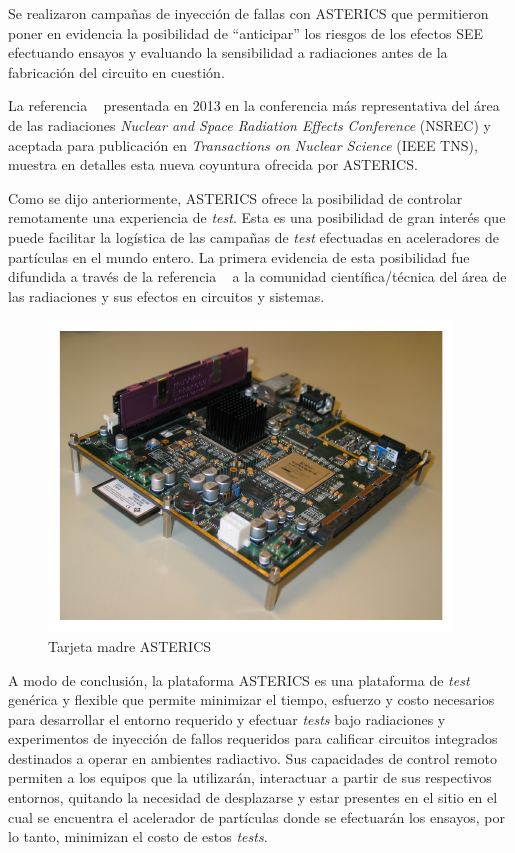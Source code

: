 \documentclass[a4paper,openright,12pt]{report}
\begin{document}
Se realizaron campañas de inyección de fallas con ASTERICS que permitieron poner en evidencia la posibilidad de ``anticipar'' los riesgos de los efectos SEE efectuando ensayos y evaluando la sensibilidad a radiaciones antes de la fabricación del circuito en cuestión. 

La referencia ~\cite{6678236} presentada en 2013 en la conferencia  más representativa del área de las radiaciones \textit{Nuclear and Space Radiation Effects Conference} (NSREC) y aceptada para publicación en \textit{Transactions on Nuclear Science}  (IEEE TNS), muestra en detalles esta nueva coyuntura ofrecida por ASTERICS. 

Como se dijo anteriormente, ASTERICS ofrece la posibilidad de controlar  remotamente una experiencia de \textit{test}. Esta es una posibilidad de gran interés que puede facilitar la logística de las campañas de \textit{test} efectuadas en aceleradores de partículas en el mundo entero. La primera evidencia de esta posibilidad fue difundida a través de la referencia ~\cite{4638624} a la comunidad científica/técnica del área de las radiaciones y sus efectos en circuitos y sistemas.
 

\begin{figure}[H]
	\centering
	\includegraphics[width=0.45 \textwidth]{img/ASTERICS2.pdf}
	\caption{Tarjeta madre ASTERICS}
	\label{ASTERICS1}
\end{figure}


A modo de conclusión, la plataforma ASTERICS es una plataforma de \textit{test} genérica y flexible que permite minimizar el tiempo, esfuerzo y costo necesarios para desarrollar el  entorno requerido y efectuar \textit{tests} bajo radiaciones y experimentos de inyección de fallos requeridos para calificar circuitos integrados destinados a operar en ambientes radiactivo. Sus capacidades de control remoto permiten a los equipos que la utilizarán,  interactuar a partir de sus respectivos entornos, quitando la necesidad de desplazarse y estar presentes en el sitio en el cual se encuentra el acelerador de partículas donde se efectuarán los ensayos,  por lo tanto, minimizan el costo de estos \textit{tests}.
\end{document}
